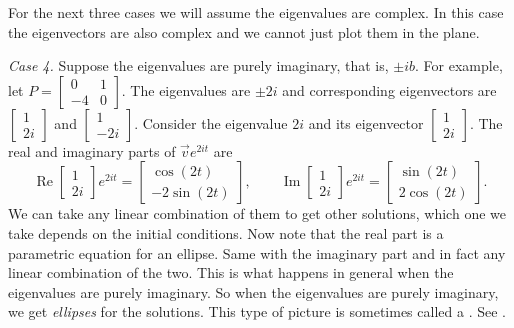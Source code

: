 \medskip

\pagebreak[0]
For the next three cases we will assume the eigenvalues are complex.  In this
case the eigenvectors are also complex and we cannot just plot them in the
plane.

\medskip

\pagebreak[0]
\emph{Case 4.} Suppose the eigenvalues are purely imaginary, that is,
$\pm ib$.  For example,
let $P = 
\left[ \begin{smallmatrix} 0 & 1 \\ -4 & 0 \end{smallmatrix} \right]$.
The eigenvalues are $\pm 2i$ and corresponding eigenvectors are
$\left[ \begin{smallmatrix} 1 \\ 2i \end{smallmatrix} \right]$ and
$\left[ \begin{smallmatrix} 1 \\ -2i \end{smallmatrix} \right]$.  Consider
the eigenvalue $2i$ and its eigenvector
$\left[ \begin{smallmatrix} 1 \\ 2i \end{smallmatrix} \right]$.
The real and imaginary
parts of $\vec{v} e^{2it}$ are
\begin{equation*}
\operatorname{Re}
\begin{bmatrix} 1 \\ 2i \end{bmatrix} e^{2it} =
\begin{bmatrix} \cos (2t) \\ -2 \sin (2t)  \end{bmatrix} ,
\qquad
\operatorname{Im}
\begin{bmatrix} 1 \\ 2i \end{bmatrix} e^{2it} =
\begin{bmatrix} \sin (2t) \\ 2 \cos (2t) \end{bmatrix} .
\end{equation*}
We can take any linear combination of them to get other solutions,
which one we take
depends on the initial
conditions.  Now note that the real part is
a parametric equation for an ellipse.  Same with the imaginary part
and in fact any linear combination of the two.
This is what happens in general when the eigenvalues are purely imaginary.
So when the eigenvalues are purely imaginary, we get
\emph{ellipses} for the
solutions.  This type of picture is sometimes called a
\emph{}.  See .

